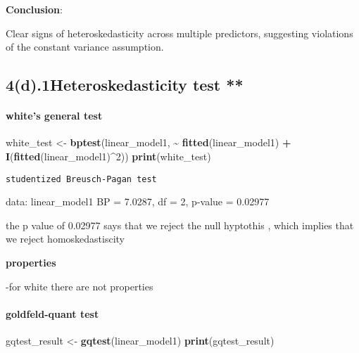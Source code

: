 \documentclass[
]{article}
\newenvironment{Shaded}{\begin{snugshade}}{\end{snugshade}}
\newcommand{\DecValTok}[1]{\textcolor[rgb]{0.00,0.00,0.81}{#1}}
\newcommand{\FunctionTok}[1]{\textcolor[rgb]{0.13,0.29,0.53}{\textbf{#1}}}
\newcommand{\NormalTok}[1]{#1}
\newcommand{\OtherTok}[1]{\textcolor[rgb]{0.56,0.35,0.01}{#1}}
\newcommand{\SpecialCharTok}[1]{\textcolor[rgb]{0.81,0.36,0.00}{\textbf{#1}}}
\begin{document}
\textbf{Conclusion}:

Clear signs of heteroskedasticity across multiple predictors, suggesting
violations of the constant variance assumption.

\subsection{\texorpdfstring{\textbf{4(d).1}Heteroskedasticity test
**}{4(d).1Heteroskedasticity test **}}\label{d.1heteroskedasticity-test}

\paragraph{\texorpdfstring{\textbf{white's general
test}}{white's general test}}\label{whites-general-test}

\begin{Shaded}
\begin{Highlighting}[]
\NormalTok{white\_test }\OtherTok{\textless{}{-}} \FunctionTok{bptest}\NormalTok{(linear\_model1, }\SpecialCharTok{\textasciitilde{}} \FunctionTok{fitted}\NormalTok{(linear\_model1) }\SpecialCharTok{+} \FunctionTok{I}\NormalTok{(}\FunctionTok{fitted}\NormalTok{(linear\_model1)}\SpecialCharTok{\^{}}\DecValTok{2}\NormalTok{))}
\FunctionTok{print}\NormalTok{(white\_test)}
\end{Highlighting}
\end{Shaded}

\begin{verbatim}
studentized Breusch-Pagan test
\end{verbatim}

data: linear\_model1 BP = 7.0287, df = 2, p-value = 0.02977

the p value of 0.02977 says that we reject the null hyptothis , which
implies that we reject homoskedastiscity

\textbf{properties}

-for white there are not properties

\paragraph{\texorpdfstring{\textbf{goldfeld-quant
test}}{goldfeld-quant test}}\label{goldfeld-quant-test}

\begin{Shaded}
\begin{Highlighting}[]
\NormalTok{gqtest\_result }\OtherTok{\textless{}{-}} \FunctionTok{gqtest}\NormalTok{(linear\_model1)}
\FunctionTok{print}\NormalTok{(gqtest\_result)}
\end{Highlighting}
\end{Shaded}
\end{document}
